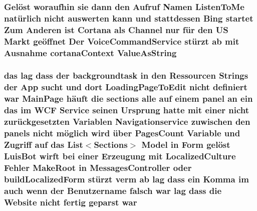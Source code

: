 \subsubsection[{\texorpdfstring{Value\+As\+String}{ValueAsString}}]{\setlength{\rightskip}{0pt plus 5cm}Gelöst woraufhin sie dann den Aufruf Namen Listen\+To\+Me natürlich nicht auswerten kann und stattdessen Bing startet Zum Anderen ist Cortana als Channel nur für den US Markt geöffnet Der Voice\+Command\+Service stürzt ab mit Ausnahme cortana\+Context Value\+As\+String}\hypertarget{_r_e_a_d_m_e_8txt_a5efed622080494c17160e34d1aa15886}{}\label{_r_e_a_d_m_e_8txt_a5efed622080494c17160e34d1aa15886}
\subsubsection[{\texorpdfstring{war}{war}}]{\setlength{\rightskip}{0pt plus 5cm}das lag dass der backgroundtask in den Ressourcen Strings der App sucht und dort Loading\+Page\+To\+Edit nicht definiert war Main\+Page häuft die sections alle auf einem panel an ein das im W\+CF Service seinen Ursprung hatte mit einer nicht zurückgesetzten Variablen Navigationservice zuwischen den panels nicht möglich wird über Pages\+Count Variable und Zugriff auf das List$<$Sections$>$ Model in Form gelöst Luis\+Bot wirft bei einer Erzeugung mit Localized\+Culture Fehler Make\+Root in Messages\+Controller oder build\+Localized\+Form stürzt verm ab lag dass ein Komma im auch wenn der Benutzername falsch war lag dass die Website nicht fertig geparst war}\hypertarget{_r_e_a_d_m_e_8txt_a2a72fc7da943588cba8c302409b22e53}{}\label{_r_e_a_d_m_e_8txt_a2a72fc7da943588cba8c302409b22e53}
